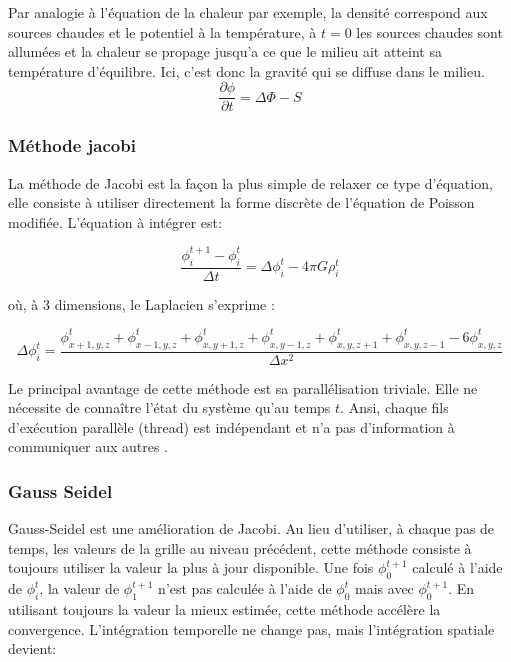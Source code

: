 Par analogie à l'équation de la chaleur par exemple, la densité correspond aux sources chaudes et le potentiel à la température, à $t=0$ les sources chaudes sont allumées et la chaleur se propage jusqu'a ce que le milieu ait atteint sa température d'équilibre. Ici, c'est donc la gravité qui se diffuse dans le milieu. \\


\begin{equation}
\dfrac{\partial \phi}{\partial t} = \Delta \Phi -S 
\end{equation}


\subsubsection{Méthode jacobi}


La méthode de Jacobi est la façon la plus simple de relaxer ce type d'équation, elle consiste à utiliser directement la forme discrète de l'équation de Poisson modifiée. L'équation à intégrer est:

\[ \dfrac{\phi^{t+1}_i - \phi^{t}_i}{\Delta t}  =  \Delta \phi_i^t - 4 \pi G \rho^t_i \]

où, à 3 dimensions, le Laplacien s'exprime :

\[ \Delta \phi_i^t = \dfrac{\phi_{x+1,y,z}^t  + \phi_{x-1,y,z}^t + \phi_{x,y+1,z}^t  + \phi_{x,y-1,z}^t + \phi_{x,y,z+1}^t + \phi_{x,y,z-1}^t	- 6\phi_{x,y,z}^t}{\Delta x ^2} \]
		
Le principal avantage de cette méthode est sa parallélisation triviale. 
Elle ne nécessite de connaître l'état du système qu'au temps $t$. 
Ansi, chaque fils d'exécution parallèle (thread) est indépendant et n'a pas d'information à communiquer aux autres .



\subsubsection{Gauss Seidel}
Gauss-Seidel est une amélioration de Jacobi. Au lieu d'utiliser, à chaque pas de temps, les valeurs de la grille au niveau précédent, cette méthode consiste à toujours utiliser la valeur la plus à jour disponible. Une fois $\phi^{t+1}_0$ calculé à l'aide de $\phi^{t}_i$, la valeur de $\phi^{t+1}_1$ n'est pas calculée à l'aide de $\phi^{t}_0$ mais avec $\phi^{t+1}_0$. En utilisant toujours la valeur la mieux estimée, cette méthode accélère la convergence. L'intégration temporelle ne change pas, mais l'intégration spatiale devient: 

